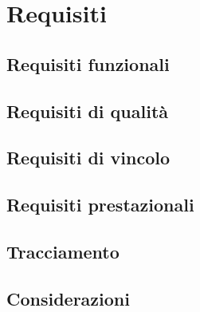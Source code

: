\section{Requisiti}

\subsection{Requisiti funzionali}

\subsection{Requisiti di qualità}

\subsection{Requisiti di vincolo}

\subsection{Requisiti prestazionali}

\subsection{Tracciamento}

\subsection{Considerazioni}